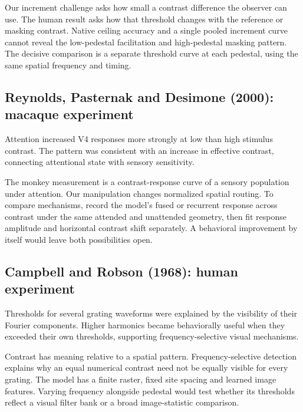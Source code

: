 \documentclass[11pt]{article}
\begin{document}
Our increment challenge asks how small a contrast difference the observer can use. The human result asks how that threshold changes with the reference or masking contrast. Native ceiling accuracy and a single pooled increment curve cannot reveal the low-pedestal facilitation and high-pedestal masking pattern. The decisive comparison is a separate threshold curve at each pedestal, using the same spatial frequency and timing.

\subsection{Reynolds, Pasternak and Desimone (2000): macaque experiment}
Attention increased V4 responses more strongly at low than high stimulus contrast. The pattern was consistent with an increase in effective contrast, connecting attentional state with sensory sensitivity. \cite{bio_reynolds00}

The monkey measurement is a contrast-response curve of a sensory population under attention. Our manipulation changes normalized spatial routing. To compare mechanisms, record the model’s fused or recurrent response across contrast under the same attended and unattended geometry, then fit response amplitude and horizontal contrast shift separately. A behavioral improvement by itself would leave both possibilities open.

\subsection{Campbell and Robson (1968): human experiment}
Thresholds for several grating waveforms were explained by the visibility of their Fourier components. Higher harmonics became behaviorally useful when they exceeded their own thresholds, supporting frequency-selective visual mechanisms. \cite{bio_campbell}

Contrast has meaning relative to a spatial pattern. Frequency-selective detection explains why an equal numerical contrast need not be equally visible for every grating. The model has a finite raster, fixed site spacing and learned image features. Varying frequency alongside pedestal would test whether its thresholds reflect a visual filter bank or a broad image-statistic comparison.
\end{document}
